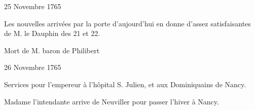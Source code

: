                     \begin{diary}{25 Novembre 1765}{}
                        
                         Les nouvelles arrivées par la
                              porte d'aujourd'hui
                           en donne d'assez satisfaisantes de M. le
                              Dauphin
                           des 21 et 22. \bigskip
        
        
                         Mort de M.  baron de Philibert
                        \bigskip
        
        
                     \end{diary}

                     \begin{diary}{26 Novembre 1765}{}
                        
                         Services pour l'empereur à l'hôpital S. Julien,
                           et aux Dominiquains de
                              Nancy. \bigskip
        
        
                        
                           Madame l'intendante arrive de Neuviller pour
                           passer l'hiver à Nancy. \bigskip
        
        
                     \end{diary}
                     
